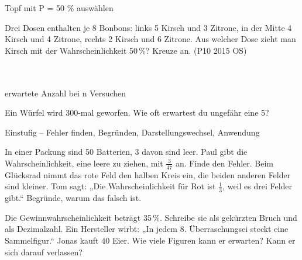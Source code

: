 \begin{aufgabe}{Topf mit P = 50 \% auswählen}
\begin{teile}
\teil Drei Dosen enthalten je 8 Bonbons: links 5 Kirsch und 3 Zitrone, in der Mitte 4 Kirsch und 4 Zitrone, rechts 2 Kirsch und 6 Zitrone. Aus welcher Dose zieht man Kirsch mit der Wahrscheinlichkeit 50\,\%? Kreuze an. \hfill (P10 2015 OS) \\  \\  \\ 
\end{teile}
\end{aufgabe}

\begin{aufgabe}{erwartete Anzahl bei n Versuchen}
\begin{teile}
\teil Ein Würfel wird 300-mal geworfen. Wie oft erwartest du ungefähr eine 5?
\end{teile}
\end{aufgabe}

\begin{aufgabe}{Einstufig – Fehler finden, Begründen, Darstellungswechsel, Anwendung}
\begin{teile}
\teil In einer Packung sind 50 Batterien, 3 davon sind leer. Paul gibt die Wahrscheinlichkeit, eine leere zu ziehen, mit $\frac{3}{47}$ an. Finde den Fehler.
\teil Beim Glücksrad nimmt das rote Feld den halben Kreis ein, die beiden anderen Felder sind kleiner. Tom sagt: „Die Wahrscheinlichkeit für Rot ist $\frac{1}{3}$, weil es drei Felder gibt.“ Begründe, warum das falsch ist.

\teil Die Gewinnwahrscheinlichkeit beträgt 35\,\%. Schreibe sie als gekürzten Bruch und als Dezimalzahl.
\teil Ein Hersteller wirbt: „In jedem 8. Überraschungsei steckt eine Sammelfigur.“ Jonas kauft 40 Eier. Wie viele Figuren kann er erwarten? Kann er sich darauf verlassen?
\end{teile}
\end{aufgabe}
